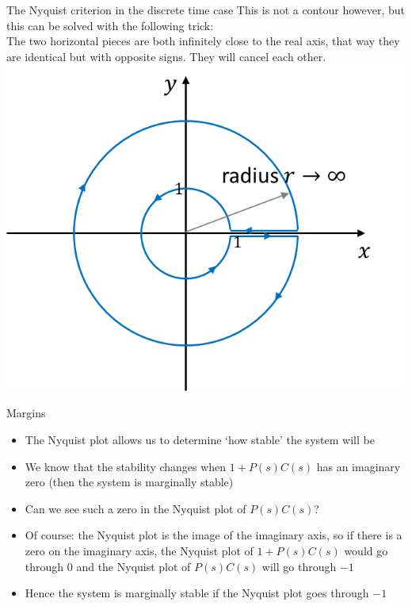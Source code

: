 \begin{frame}{The Nyquist criterion in the discrete time case}
This is not a contour however, but this can be solved with the following trick:
\\ The two horizontal pieces are both infinitely close to the real axis, that way they are identical but with 	opposite signs. They will cancel each other.
\\ \includegraphics[width= 0.7\linewidth]{Afbeelding16}
\end {frame}

\begin{frame}{Margins}
\begin{itemize}
\item The Nyquist plot allows us to determine ‘how stable’ the system will be
\item We know that the stability changes when $1+P(s)C(s)$ has an imaginary zero (then the system is marginally stable)
\item Can we see such a zero in the Nyquist plot of $P(s)C(s)$?
\item Of course: the Nyquist plot is the image of the imaginary axis, so if there is a zero on the imaginary axis, the Nyquist plot of $1+P(s)C(s)$ would go through $0$ and the Nyquist plot of $P(s)C(s)$ will go through $-1$
\item Hence the system is marginally stable if the Nyquist plot goes through $-1$
\end{itemize}
\end {frame}

